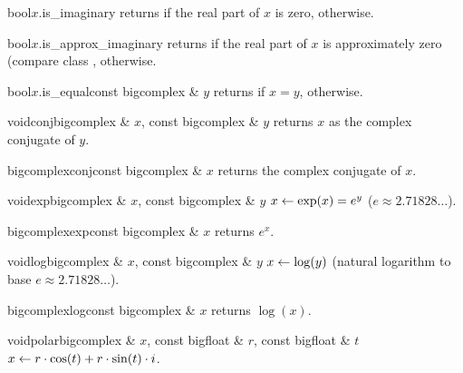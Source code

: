 \begin{cfcode}{bool}{$x$.is_imaginary}{}
  returns \TRUE if the real part of $x$ is zero, \FALSE otherwise.
\end{cfcode}

\begin{cfcode}{bool}{$x$.is_approx_imaginary}{}
  returns \TRUE if the real part of $x$ is approximately zero (compare class ,
  \FALSE otherwise.
\end{cfcode}

\begin{cfcode}{bool}{$x$.is_equal}{const bigcomplex & $y$}
  returns \TRUE if $x = y$, \FALSE otherwise.
\end{cfcode}



\BASIC

\begin{fcode}{void}{conj}{bigcomplex & $x$, const bigcomplex & $y$}
  returns $x$ as the complex conjugate of $y$.
\end{fcode}

\begin{fcode}{bigcomplex}{conj}{const bigcomplex & $x$}
  returns the complex conjugate of $x$.
\end{fcode}

\begin{fcode}{void}{exp}{bigcomplex & $x$, const bigcomplex & $y$}
  $x \leftarrow \exp(x) = e^y$ ($e \approx 2.71828\dots$).
\end{fcode}

\begin{fcode}{bigcomplex}{exp}{const bigcomplex & $x$}
  returns $e^x$.
\end{fcode}

\begin{fcode}{void}{log}{bigcomplex & $x$, const bigcomplex & $y$}
  $x \leftarrow \log(y)$ (natural logarithm to base $e \approx 2.71828\dots$).
\end{fcode}

\begin{fcode}{bigcomplex}{log}{const bigcomplex & $x$}
  returns $ \log(x)$.
\end{fcode}

\begin{fcode}{void}{polar}{bigcomplex & $x$, const bigfloat & $r$, const bigfloat & $t$}
  $x \leftarrow r \cdot \cos(t) + r \cdot \sin(t) \cdot i$.
\end{fcode}

